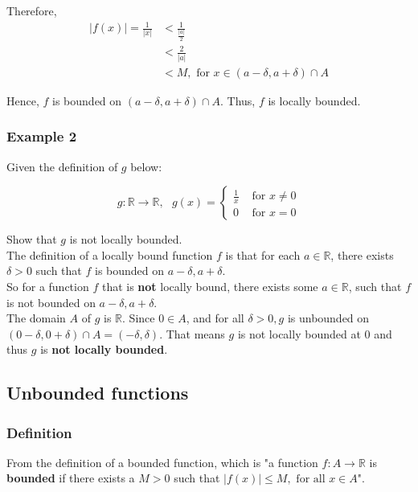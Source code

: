 \documentclass[11pt]{article}
\begin{document}
Therefore,
\begin{align*}
|f(x)| = \frac{1}{|x|} &< \frac{1}{\frac{|a|}{2}} \\
&< \frac{2}{|a|} \\
&< M, \text{ for } x \in (a - \delta, a + \delta) \cap A
\end{align*}

Hence, \(f\) is bounded on \((a - \delta, a + \delta) \cap A\). Thus, \(f\) is locally bounded.


\subsubsection{Example 2}
\label{sec:orgabd4f88}

Given the definition of \(g\) below:

\begin{equation*}
g : \mathbb{R} \rightarrow \mathbb{R}, \text{ } g(x) = \begin{cases}
\frac{1}{x} & \text{ for } x \neq 0 \\
0 & \text{ for } x = 0
\end{cases}
\end{equation*}

Show that \(g\) is not locally bounded.
\\[0pt]

The definition of a locally bound function \(f\) is that for each \(a \in \mathbb{R}\), there exists \(\delta > 0\) such that \(f\) is bounded on \(a - \delta, a + \delta\).
\\[0pt]

So for a function \(f\) that is \textbf{not} locally bound, there exists some \(a \in \mathbb{R}\), such that \(f\) is not bounded on \(a - \delta, a + \delta\).
\\[0pt]

The domain \(A\) of \(g\) is \(\mathbb{R}\). Since \(0 \in A\), and for all \(\delta > 0, g\) is unbounded on \((0 - \delta, 0 + \delta) \cap A = (-\delta, \delta)\). That means \(g\) is not locally bounded at 0 and thus \(g\) is \textbf{not locally bounded}.


\subsection{Unbounded functions}
\label{sec:orgd7ba15a}

\subsubsection{Definition}
\label{sec:org43df6d4}
From the definition of a bounded function, which is "a function \(f : A \rightarrow \mathbb{R}\) is \textbf{bounded} if there exists a \(M > 0\) such that \(|f(x)| \le M, \text{ for all } x \in A\)".
\\[0pt]
\end{document}
